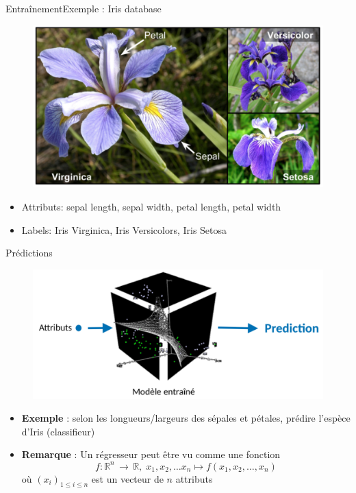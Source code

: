 \documentclass[compress]{beamer}
\begin{document}
\begin{frame}{Entraînement}{Exemple : Iris database}
  \begin{figure}
    \centering
    \includegraphics[width=0.7\linewidth]{resources/iris}
  \end{figure}
  \vspace{-.05\linewidth}
  \begin{itemize}
    \item Attributs: sepal length, sepal width, petal length, petal width
    \item Labels: Iris Virginica, Iris Versicolors, Iris Setosa
  \end{itemize}
\end{frame}

\begin{frame}{Prédictions}
  \begin{figure}
  \centering
  \includegraphics[width=0.7\linewidth]{resources/resume2}
  \end{figure}
  \vspace{-.05\linewidth}
  \begin{itemize}
    \item \textbf{\color{fibeamer@orange}Exemple} : selon les longueurs/largeurs des sépales et pétales, prédire l'espèce d'Iris (classifieur)
    \item \textbf{\color{fibeamer@orange}Remarque} : Un régresseur peut être vu comme une fonction
    \[ f: \mathbb{R}^n \, \rightarrow \, \mathbb{R}, \; x_1, x_2, \dots x_n \mapsto f(x_1, x_2, \dots, x_n)\]
    où $(x_i)_{1\leq i \leq n}$ est un vecteur de $n$ attributs
  \end{itemize}
\end{frame}
\end{document}
